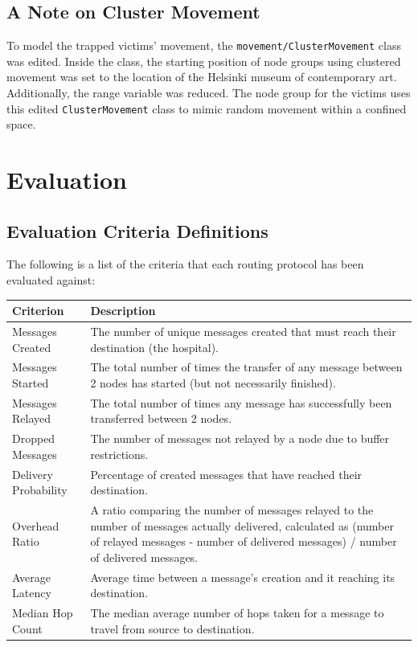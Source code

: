\documentclass{article}
\begin{document}
\subsection{A Note on Cluster Movement}
To model the trapped victims' movement, the \texttt{movement/ClusterMovement} class was edited. Inside the class, the starting position of node groups using clustered movement was set to the location of the Helsinki museum of contemporary art. Additionally, the range variable was reduced. The node group for the victims uses this edited \texttt{ClusterMovement} class to mimic random movement within a confined space.

\newpage
\section{Evaluation}
\subsection{Evaluation Criteria Definitions}
The following is a list of the criteria that each routing protocol has been evaluated against:

\begin{center}
\begin{tabular}{|l|p{13cm}|}
\hline
\textbf{Criterion} & \textbf{Description} \\ \hline
Messages Created & The number of unique messages created that must reach their destination (the hospital). \\ \hline
Messages Started & The total number of times the transfer of any message between 2 nodes has started (but not necessarily finished). \\ \hline
Messages Relayed & The total number of times any message has successfully been transferred between 2 nodes. \\ \hline
Dropped Messages & The number of messages not relayed by a node due to buffer restrictions. \\ \hline
Delivery Probability & Percentage of created messages that have reached their destination. \\ \hline
Overhead Ratio & A ratio comparing the number of messages relayed to the number of messages actually delivered, calculated as (number of relayed messages - number of delivered messages) / number of delivered messages. \\ \hline
Average Latency & Average time between a message's creation and it reaching its destination. \\ \hline
Median Hop Count & The median average number of hops taken for a message to travel from source to destination. \\ \hline
\end{tabular}
\end{center}
\end{document}
